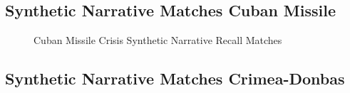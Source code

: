 \documentclass{article}
\begin{document}
\hypertarget{synthetic-narrative-matches-cuban-missile}{%
\subsection{Synthetic Narrative Matches Cuban
Missile}\label{synthetic-narrative-matches-cuban-missile}}

\hphantom{em}

\begin{figure}[H]
\caption{ Cuban Missile Crisis Synthetic Narrative Recall Matches \label{fig:ft_cuba_recall}}
\end{figure}
\clearpage

\hypertarget{synthetic-narrative-matches-crimea-donbas}{%
\subsection{Synthetic Narrative Matches
Crimea-Donbas}\label{synthetic-narrative-matches-crimea-donbas}}
\end{document}
